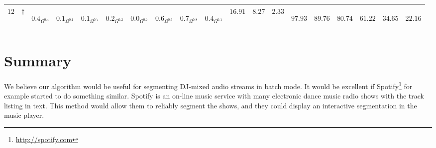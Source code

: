 \documentclass[twocolumn]{article}
\begin{document}
\begin{table}[t]
\begin{tabular}{|l|l|llllllll|lll|llllll|}
		\hline 
$12$ &	$\dagger$	&\begin{sideways}$0.4_{\Omega^{0.4}}$\end{sideways}&\begin{sideways}$0.1_{\Omega^{0.1}}$\end{sideways}&\begin{sideways}$0.1_{\Omega^{0.7}}$\end{sideways}&\begin{sideways}$0.2_{\Omega^{0.2}}$\end{sideways}&\begin{sideways}$0.0_{\Omega^{0.7}}$\end{sideways}&\begin{sideways}$0.6_{\Omega^{0.6}}$\end{sideways}&\begin{sideways}$0.7_{\Omega^{0.8}}$\end{sideways}&\begin{sideways}$0.4_{\Omega^{0.1}}$\end{sideways}&$16.91 $&$ 8.27 $& $ 2.33 $& \begin{sideways}$97.93$\end{sideways}& \begin{sideways}$89.76$\end{sideways}&\begin{sideways}$ 80.74$\end{sideways}&\begin{sideways}$ 61.22$\end{sideways}& \begin{sideways}$34.65$ \end{sideways}& \begin{sideways}$22.16$\end{sideways} \\
		
		
				\hline 
	\end{tabular}
	
	\label{tab:results}
\end{table}


\section{Summary}\label{conclusions}

We believe our algorithm would be useful for segmenting DJ-mixed audio streams in batch mode. It would be excellent if Spotify\footnote{\url{http://spotify.com}} for example started to do something similar. Spotify is an on-line music service with many electronic dance music radio shows with the track listing in text. This method would allow them to reliably segment the shows, and they could display an interactive segmentation in the music player. 
\end{document}
